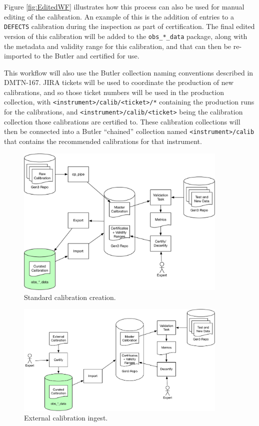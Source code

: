 \documentclass[DM,authoryear,toc]{lsstdoc}
\begin{document}
Figure \ref{fig:EditedWF} illustrates how this process can also be used
for manual editing of the calibration.  An example of this is the
addition of entries to a \verb|DEFECTS| calibration during the
inspection as part of certification.  The final edited version of this
calibration will be added to the \verb|obs_*_data| package, along with
the metadata and validity range for this calibration, and that can
then be re-imported to the Butler and certified for use.

This workflow will also use the Butler collection naming conventions
described in DMTN-167.  JIRA tickets will be used to coordinate the
production of new calibrations, and so those ticket numbers will be
used in the production collection, with
\verb|<instrument>/calib/<ticket>/*| containing the production runs
for the calibrations, and \verb|<instrument>/calib/<ticket>| being the
calibration collection those calibrations are certified to.  These
calibration collections will then be connected into a Butler
``chained'' collection named \verb|<instrument>/calib| that contains
the recommended calibrations for that instrument.

\begin{figure}
  \caption{Standard calibration creation. \label{fig:StandardWF}}
  \centering
  \includegraphics[width=0.9\textwidth]{figures/Standard_Calibration.pdf}
\end{figure}

\begin{figure}
  \caption{External calibration ingest. \label{fig:ExternalWF}}
  \centering
  \includegraphics[width=0.9\textwidth]{figures/External_Calibration.pdf}
\end{figure}
\end{document}
